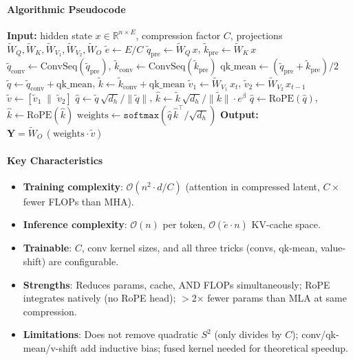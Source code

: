 \paragraph{Algorithmic Pseudocode}
\begin{algorithmic}[1]
\State \textbf{Input:} hidden state $x \in \mathbb{R}^{n \times E}$, compression factor $C$, projections $\tilde{W}_Q, \tilde{W}_K, \tilde{W}_{V_1}, \tilde{W}_{V_2}, \tilde{W}_O$
\State $\tilde{e} \gets E / C$ 
\State $\tilde{q}_{\text{pre}} \gets \tilde{W}_Q\, x$, \quad $\tilde{k}_{\text{pre}} \gets \tilde{W}_K\, x$ 
\State $\tilde{q}_{\text{conv}} \gets \text{ConvSeq}(\tilde{q}_{\text{pre}})$, \quad $\tilde{k}_{\text{conv}} \gets \text{ConvSeq}(\tilde{k}_{\text{pre}})$ 
\State $\text{qk\_mean} \gets (\tilde{q}_{\text{pre}} + \tilde{k}_{\text{pre}}) / 2$ 
\State $\tilde{q} \gets \tilde{q}_{\text{conv}} + \text{qk\_mean}$, \quad $\tilde{k} \gets \tilde{k}_{\text{conv}} + \text{qk\_mean}$
\State $\tilde{v}_1 \gets \tilde{W}_{V_1}\, x_t$, \quad $\tilde{v}_2 \gets \tilde{W}_{V_2}\, x_{t-1}$ 
\State $\tilde{v} \gets [\tilde{v}_1 \;\|\; \tilde{v}_2]$ 
\State $\hat{q} \gets \tilde{q}\, \sqrt{d_h} / \|\tilde{q}\|$, \quad $\hat{k} \gets \tilde{k}\, \sqrt{d_h} / \|\tilde{k}\| \cdot e^{\beta}$ 
\State $\hat{q} \gets \text{RoPE}(\hat{q})$, \quad $\hat{k} \gets \text{RoPE}(\hat{k})$ 
\State $\text{weights} \gets \texttt{softmax}(\hat{q}\, \hat{k}^\top / \sqrt{d_h})$
\State \textbf{Output:} $\mathbf{Y} = \tilde{W}_O\, (\text{weights} \cdot \tilde{v})$
\end{algorithmic}

\paragraph{Key Characteristics}
\begin{itemize}[leftmargin=*]
    \item \textbf{Training complexity}: $\mathcal{O}(n^2 \cdot d / C)$ (attention in compressed latent, $C{\times}$ fewer FLOPs than MHA).
    \item \textbf{Inference complexity}: $\mathcal{O}(n)$ per token, $\mathcal{O}(\tilde{e} \cdot n)$ KV-cache space.
    \item \textbf{Trainable}: $C$, conv kernel sizes, and all three tricks (convs, qk-mean, value-shift) are configurable.
    \item \textbf{Strengths}: Reduces params, cache, AND FLOPs simultaneously; RoPE integrates natively (no RoPE head); $>$2$\times$ fewer params than MLA at same compression.
    \item \textbf{Limitations}: Does not remove quadratic $S^2$ (only divides by $C$); conv/qk-mean/v-shift add inductive bias; fused kernel needed for theoretical speedup.
\end{itemize}

